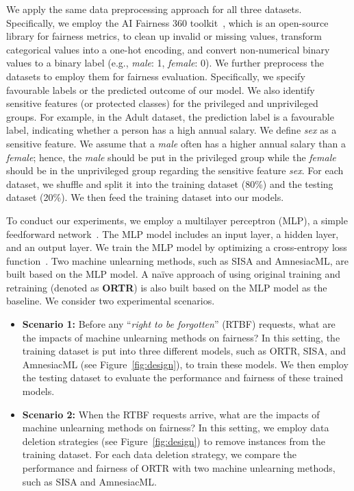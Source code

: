We apply the same data preprocessing approach for all three datasets. Specifically, we employ the AI Fairness 360 toolkit~\cite{aif360}, which is an open-source library for fairness metrics, to clean up invalid or missing values, transform categorical values into a one-hot encoding, and convert non-numerical binary values to a binary label (e.g., \textit{male}: 1, \textit{female}: 0). We further preprocess the datasets to employ them for fairness evaluation. Specifically, we specify favourable labels or the predicted outcome of our model. We also identify sensitive features (or protected classes) for the privileged and unprivileged groups.
For example, in the Adult dataset, the prediction label is a favourable label, indicating whether a person has a high annual salary. We define \textit{sex} as a sensitive feature. We assume that a \textit{male} often has a higher annual salary than a \textit{female}; hence, the \textit{male} should be put in the privileged group while the \textit{female} should be in the unprivileged group regarding the sensitive feature \textit{sex}. 
For each dataset, we shuffle and split it into the training dataset (80\%) and the testing dataset (20\%). We then feed the training dataset into our models. 

To conduct our experiments, we employ a multilayer perceptron (MLP), a simple feedforward network~\cite{ramchoun2016multilayer}. The MLP model includes an input layer, a hidden layer, and an output layer. We train the MLP model by optimizing a cross-entropy loss function~\cite{martinez2018taming}. Two machine unlearning methods, such as SISA and AmnesiacML, are built based on the MLP model. A na\"ive approach of using original training and retraining (denoted as \textbf{ORTR}) is also built based on the MLP model as the baseline. We consider two experimental scenarios. 

\begin{itemize} [leftmargin=*]
    \item \textbf{Scenario 1:}
    Before any ``\textit{right to be forgotten}'' (RTBF) requests, what are the impacts of machine unlearning methods on fairness? In this setting, the training dataset is put into three different models, such as ORTR, SISA, and AmnesiacML (see Figure~\ref{fig:design}), to train these models. We then employ the testing dataset to evaluate the performance and fairness of these trained models. 
    \item \textbf{Scenario 2:} When the RTBF requests arrive, what are the impacts of machine unlearning methods on fairness? In this setting, we employ data deletion strategies (see Figure~\ref{fig:design}) to remove instances from the training dataset. For each data deletion strategy, we compare the performance and fairness of ORTR with two machine unlearning methods, such as SISA and AmnesiacML. 
\end{itemize}






